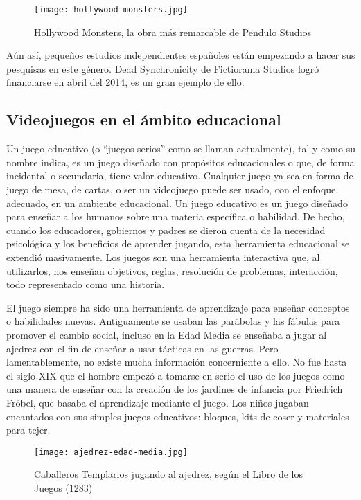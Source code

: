 \begin{figure}[H] 
  \begin{center}
    \texttt{[image: hollywood-monsters.jpg]}
  \end{center}
  \caption{Hollywood Monsters, la obra más remarcable de Pendulo Studios}
    \label{fig:hollywood-monsters}
\end{figure}

Aún así, pequeños estudios independientes españoles están empezando a hacer sus  pesquisas en este género. Dead Synchronicity  de Fictiorama Studios logró financiarse en abril del 2014, es un gran ejemplo de ello.

\subsection{Videojuegos en el ámbito educacional}
Un juego educativo (o ``juegos serios'' como se llaman actualmente), tal y como su nombre indica, es un juego diseñado con propósitos educacionales o que, de forma incidental o secundaria, tiene valor educativo. Cualquier juego ya sea en forma de juego de mesa, de cartas, o ser un videojuego puede ser usado, con el enfoque adecuado, en un ambiente educacional. Un juego educativo es un juego diseñado para enseñar a los humanos sobre una materia específica o habilidad. De hecho, cuando los educadores, gobiernos y padres se dieron cuenta de la necesidad psicológica y los beneficios de aprender jugando, esta herramienta educacional se extendió masivamente. Los juegos son una herramienta interactiva que, al utilizarlos, nos enseñan objetivos, reglas, resolución de problemas, interacción, todo representado como una historia.

El juego siempre ha sido una herramienta de aprendizaje para enseñar conceptos o habilidades nuevas. Antiguamente se usaban las parábolas y las fábulas para promover el cambio social, incluso en la Edad Media se enseñaba a jugar al ajedrez con el fin de enseñar a usar tácticas en las guerras. Pero lamentablemente, no existe mucha información concerniente a ello. No fue hasta el siglo XIX que el hombre empezó a tomarse en serio el uso de los juegos como una manera de enseñar con la creación de los jardines de infancia por Friedrich Fröbel, que basaba el aprendizaje mediante el juego. Los niños jugaban encantados con sus simples juegos educativos: bloques, kits de coser y materiales para tejer.

\begin{figure}[H] 
	\begin{center}
		\texttt{[image: ajedrez-edad-media.jpg]}
	\end{center}
	\caption{Caballeros Templarios jugando al ajedrez, según el Libro de los Juegos (1283)}
	\label{fig:ajedrez-edad-media}
\end{figure}

